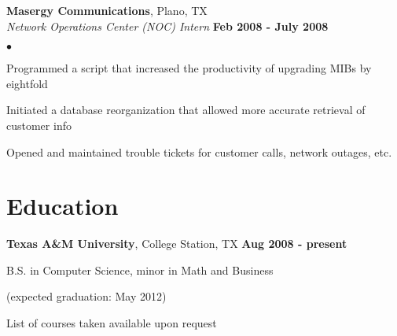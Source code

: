 \documentclass[margin,line]{res}
\newenvironment{list1}{
  \begin{list}{\ding{113}}{%
      \setlength{\itemsep}{0in}
      \setlength{\parsep}{0in} \setlength{\parskip}{0in}
      \setlength{\topsep}{0in} \setlength{\partopsep}{0in} 
      \setlength{\leftmargin}{0.17in}}}{\end{list}}
\newenvironment{list2}{
  \begin{list}{$\bullet$}{%
      \setlength{\itemsep}{0in}
      \setlength{\parsep}{0in} \setlength{\parskip}{0in}
      \setlength{\topsep}{0in} \setlength{\partopsep}{0in} 
      \setlength{\leftmargin}{0.2in}}}{\end{list}}
\begin{document}
\begin{resume}
{\bf Masergy Communications}, Plano, TX \\
{\em Network Operations Center (NOC) Intern} \hfill {\bf Feb 2008 - July 2008} \\
\vspace{-3mm}
\begin{list2}
\item Programmed a script that increased the productivity of upgrading MIBs by eightfold
\item Initiated a database reorganization that allowed more accurate retrieval of customer info
\item Opened and maintained trouble tickets for customer calls, network outages, etc.
\end{list2}

%
%
\section{\sc Education}
{\bf Texas A\&M University}, College Station, TX \hfill {\bf Aug 2008 - present} \\
\vspace*{-3mm}
\begin{list1}
\item[] B.S. in Computer Science, minor in Math and Business
\item[] (expected graduation: May 2012)
\item[] List of courses taken available upon request
%
%

\end{list1}
\end{resume}
\end{document}
